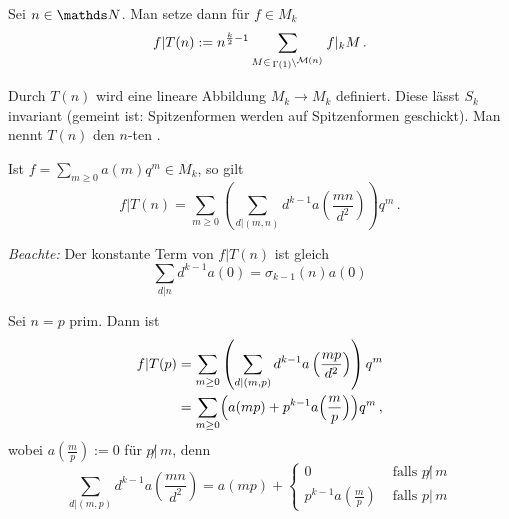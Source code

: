 \begin{defi}
Sei $n \in \NN$. Man setze dann für $f \in M_k$
\[
f | T(n) := n^{\frac k2 - 1} \sum_{M \in \linksmodulo{\Gamma(1)}{\mathcal M (n)}} f |_k M
\,.
\]
\end{defi}

\begin{satz-list}\label{TnEndoMk}
\item Durch $T(n)$ wird eine lineare Abbildung $M_k \to M_k$ definiert. Diese lässt $S_k$ invariant (gemeint ist: Spitzenformen werden auf Spitzenformen geschickt). Man nennt $T(n)$ den $n$-ten .
\item Ist $f = \sum_{m \geq 0} a(m) q^m \in M_k$, so gilt
\[
f | T(n) = \sum_{m \geq 0} \left( \sum_{d | (m,n)} d^{k-1} a\left(\frac{mn}{d^2}\right) \right) q^m
\,.
\]

\emph{Beachte:} Der konstante Term von $f | T(n)$ ist gleich
\[
\sum_{d|n} d^{k-1} a(0) = \sigma_{k-1}(n) a(0)
\]
\end{satz-list}

\begin{bsp}
Sei $n = p$ prim. Dann ist
\begin{align*}
f | T(p) &= \sum_{m \geq 0} \left( \sum_{d | (m,p)} d^{k-1} a\left(\frac{mp}{d^2}\right) \right) q^m\\
&= \sum_{m \geq 0} \Bigl( a(mp) + p^{k-1} a\Bigl( \frac mp\Bigr) \Bigr) q^m
\,,
\end{align*}
wobei $a\left(\frac mp\right) := 0$ für $p \!\! \not | \, m$, denn
\[
\sum_{d | (m,p)} d^{k-1} a \left( \frac {mn}{d^2} \right) = a(mp) + 
\begin{cases}
0 & \text{ falls } p \!\! \not | \, m\\ 
p^{k-1} a \left(\frac mp \right) & \text{ falls } p | \, m
\end{cases}
\]
\end{bsp}

